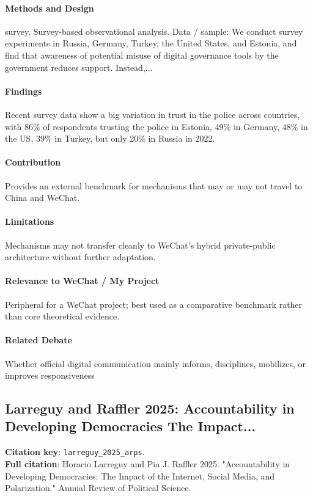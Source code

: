 \documentclass[12pt]{article}
\begin{document}
\paragraph{Methods and Design} survey. Survey-based observational analysis. Data / sample: We conduct survey experiments in Russia, Germany, Turkey, the United States, and Estonia, and find that awareness of potential misuse of digital governance tools by the government reduces support. Instead,...

\paragraph{Findings} Recent survey data show a big variation in trust in the police across countries, with 86\% of respondents trusting the police in Estonia, 49\% in Germany, 48\% in the US, 39\% in Turkey, but only 20\% in Russia in 2022.

\paragraph{Contribution} Provides an external benchmark for mechanisms that may or may not travel to China and WeChat.

\paragraph{Limitations} Mechanisms may not transfer cleanly to WeChat's hybrid private-public architecture without further adaptation.

\paragraph{Relevance to WeChat / My Project} Peripheral for a WeChat project; best used as a comparative benchmark rather than core theoretical evidence.

\paragraph{Related Debate} Whether official digital communication mainly informs, disciplines, mobilizes, or improves responsiveness


\subsection{Larreguy and Raffler 2025: Accountability in Developing Democracies The Impact...}
\textbf{Citation key}: \texttt{larreguy\_2025\_arps}.\\
\textbf{Full citation}: Horacio Larreguy and Pia J. Raffler 2025. "Accountability in Developing Democracies: The Impact of the Internet, Social Media, and Polarization." Annual Review of Political Science.
\end{document}
